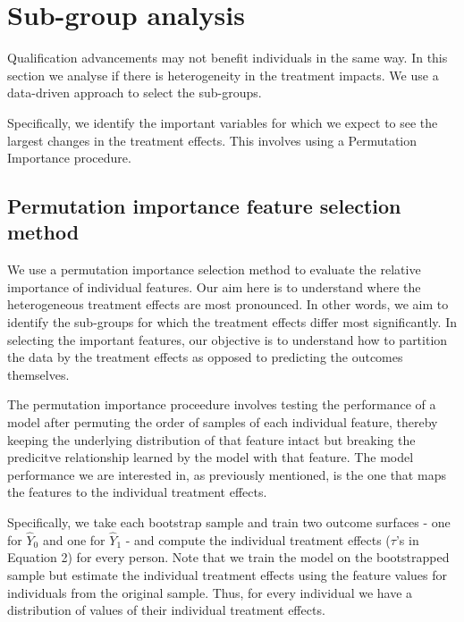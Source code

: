 \documentclass[12pt, a4paper]{article}
\begin{document}
\section{Sub-group analysis}

Qualification advancements may not benefit individuals in the same way. In this section we analyse if there is heterogeneity in the treatment impacts. We use a data-driven approach to select the sub-groups.  
%
%


Specifically, we identify the important variables for which we expect to see the largest changes in the treatment effects. This involves using a Permutation Importance procedure.




\subsection{Permutation importance feature selection method}

We use a permutation importance selection method \citep{breiman2001,molnar2020} to evaluate the relative importance of individual features. Our aim here is to understand where the heterogeneous treatment effects are most pronounced. In other words, we aim to identify the sub-groups for which the treatment effects differ most significantly. In selecting the important features, our objective is to understand how to partition the data by the treatment effects as opposed to predicting the outcomes themselves. 

The permutation importance proceedure involves testing the performance of a
model after permuting the order of samples of each individual feature, thereby
keeping the underlying distribution of that feature intact but breaking the
predicitve relationship learned by the model with that feature. The model
performance we are interested in, as previously mentioned, is the one that maps
the features to the individual treatment effects. 

Specifically, we take each bootstrap sample and train two outcome surfaces - one for $\hat{Y}_0$ and one for $\hat{Y}_1$ - and compute the individual treatment effects ($\tau$'s in Equation 2) for every person. Note that we train the model on the bootstrapped sample but estimate the individual treatment effects using the feature values for individuals from the original sample. Thus, for every individual we have a distribution of values of their individual treatment effects. 
\end{document}
